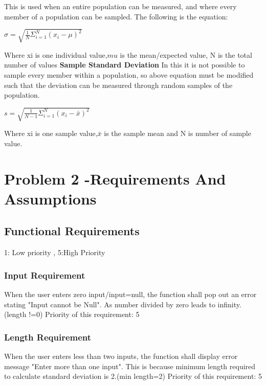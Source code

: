 \documentclass[a4paper,12pt]{article}
\begin{document}
\begin{titlepage}
This is used when an entire population can be measured, and where every member of a population can be sampled. The following is the equation:
\begin{center}
\begin{math}
\sigma=\sqrt{\frac{1}{N}\Sigma_{i=1}^{N}(x_{i}-\mu)^2}
\end{math}
\end{center}
Where xi is one individual value,$mu$ is the mean/expected value, N is the total number of values
\newline
\newline
\textbf{Sample Standard Deviation}
\newline
In this it is not possible to sample every member within a population, so above equation must be modified such that the deviation can be measured through random samples of the population. 
\begin{center}
\begin{math}
s= \sqrt{\frac{1}{N-1}\Sigma_{i=1}^{N}(x_{i}-\bar{x})^2}
\end{math}
\end{center}
Where xi is one sample value,$\bar{x}$ is the sample mean and N is number of sample value.

\section{Problem 2 -Requirements And Assumptions}
\subsection{Functional Requirements}
1: Low priority , 5:High Priority
\subsubsection{Input Requirement}
When the user enters zero input/input=null, the function shall pop out an error stating "Input cannot be Null". As number divided by zero leads to infinity. (length !=0)\newline
Priority of this requirement: 5
\subsubsection{Length Requirement}
When the user enters less than two inputs, the function shall display error message "Enter more than one input". This is because minimum length required to calculate standard deviation is 2.(min length=2)\newline
Priority of this requirement: 5

\end{titlepage}
\end{document}
